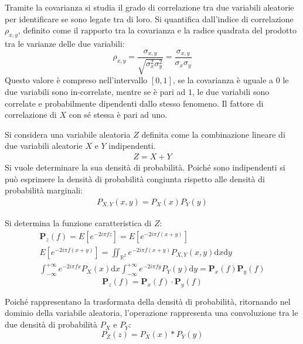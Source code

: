 \documentclass{article}
\newcommand{\df}{\mathrm{d}}
\numberwithin{equation}{subsection}
\begin{document}
Tramite la covarianza si studia il grado di correlazione tra due variabili aleatorie per identificare se sono legate tra di loro. 
Si quantifica dall'indice di correlazione $\rho_{x,y}$, definito come il rapporto tra la covarianza e la radice quadrata del prodotto tra le varianze delle due variabili:
\begin{equation}
    \rho_{x,y}=\displaystyle\frac{\sigma_{x,y}}{\sqrt{\sigma_x^2\sigma_y^2}}=\frac{\sigma_{x,y}}{\sigma_x\sigma_y}
\end{equation}
Questo valore è compreso nell'intervallo $[0,1]$, se la covarianza è uguale a $0$ le due variabili sono in-correlate, mentre se è pari ad $1$, le due variabili sono 
correlate e probabilmente dipendenti dallo stesso fenomeno. Il fattore di correlazione di $X$ con sé stessa è pari ad uno. 



Si considera una variabile aleatoria $Z$ definita come la combinazione lineare di due variabili aleatorie $X$ e $Y$ indipendenti. 
\begin{gather*}
    Z=X+Y
\end{gather*}
Si vuole determinare la sua densità di probabilità. 
Poiché sono indipendenti si può esprimere la densità di probabilità congiunta rispetto alle densità di probabilità marginali:
\begin{gather*}
    P_{X,Y}(x,y)=P_X(x)P_Y(y)
\end{gather*}

Si determina la funzione caratteristica di $Z$:
\begin{gather*}
    \mathbf{P}_z(f)=E[e^{-2i\pi fz}]=E[e^{-2i\pi f(x+y)}]\\
    E[e^{-2i\pi f(x+y)}]\displaystyle=\iint_{\mathbb{R}^2}e^{-2i\pi f(x+y)}P_{X,Y}(x,y)\df x\df y\\
    \displaystyle\int_{-\infty}^{+\infty}e^{-2i\pi fx}P_X(x)\df x\int_{-\infty}^{+\infty}e^{-2i\pi fy}P_Y(y)\df y=\mathbf{P}_x(f)\mathbf{P}_y(f)
\end{gather*}
\begin{equation}
    \mathbf{P}_z(f)=\mathbf{P}_x(f)\cdot\mathbf{P}_y(f)
\end{equation}

Poiché rappresentano la trasformata della densità di probabilità, ritornando nel dominio della variabile aleatoria, l'operazione rappresenta una convoluzione 
tra le due densità di probabilità $P_X$ e $P_Y$:
\begin{equation}
    P_Z(z)=P_X(x)*P_Y(y)
\end{equation}
\end{document}

